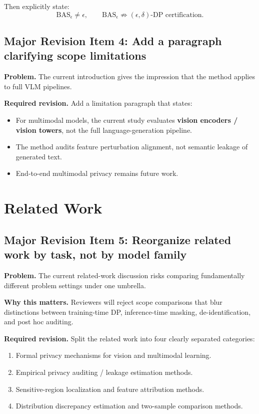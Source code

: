Then explicitly state:
\[
\mathrm{BAS}_\epsilon \neq \epsilon,
\qquad
\mathrm{BAS}_\epsilon \not\Rightarrow (\epsilon,\delta)\text{-DP certification}.
\]

\subsection*{Major Revision Item 4: Add a paragraph clarifying scope limitations}
\textbf{Problem.} The current introduction gives the impression that the method applies to full VLM pipelines.

\textbf{Required revision.}
Add a limitation paragraph that states:
\begin{itemize}
    \item For multimodal models, the current study evaluates \textbf{vision encoders / vision towers}, not the full language-generation pipeline.
    \item The method audits feature perturbation alignment, not semantic leakage of generated text.
    \item End-to-end multimodal privacy remains future work.
\end{itemize}

\section{Related Work}

\subsection*{Major Revision Item 5: Reorganize related work by task, not by model family}
\textbf{Problem.} The current related-work discussion risks comparing fundamentally different problem settings under one umbrella.

\textbf{Why this matters.} Reviewers will reject scope comparisons that blur distinctions between training-time DP, inference-time masking, de-identification, and post hoc auditing.

\textbf{Required revision.}
Split the related work into four clearly separated categories:
\begin{enumerate}
    \item Formal privacy mechanisms for vision and multimodal learning.
    \item Empirical privacy auditing / leakage estimation methods.
    \item Sensitive-region localization and feature attribution methods.
    \item Distribution discrepancy estimation and two-sample comparison methods.
\end{enumerate}

